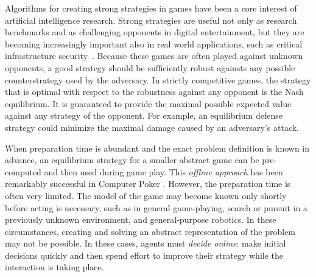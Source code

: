 \documentclass{aamas2015}
\newcounter{mlNoteCounter}
\newcommand{\mlnote}[1]{{\scriptsize \color{darkgreen} $\blacksquare$ \refstepcounter{mlNoteCounter}\textsf{[ML]$_{\arabic{mlNoteCounter}}$:{#1}}}}
\begin{document}
Algorithms for creating strong strategies in games have been a core interest of artificial intelligence research. Strong strategies are useful not only as research benchmarks and as challenging opponents in digital entertainment, but they are becoming increasingly important also in real world applications, such as critical infrastructure security~\cite{Tambe11}.
Because these games are often played against unknown opponents, a good strategy should be sufficiently robust againsts any possible counterstrategy used by the adversary. In strictly competitive games, the strategy that is optimal with respect to the robustness against any opponent is the Nash equilibrium. It is guaranteed to provide the maximal possible expected value against any strategy of the opponent. For example, an equilibrium defense strategy could minimize the maximal damage caused by an adversary's attack.

When preparation time is abundant and the exact problem definition is known in advance, an equilibrium strategy for a smaller abstract game can be pre-computed and 
then used during game play. This {\it offline approach} has been remarkably successful in 
Computer Poker \cite{Johanson07Msc,Gilpin09,Sandholm10The,Rubin11Poker,Johanson13Evaluating}. 
However, the preparation time is often very limited. The model of the game may become known only shortly before acting is necessary, such as in general game-playing, search or pursuit in a previously unknown environment, and general-purpose robotics. In these circumstances, creating and solving an abstract representation of the problem may not be possible. In these cases, agents must {\it decide online}: make initial decisions quickly and then spend effort to improve their strategy while the interaction is taking place.
\end{document}
